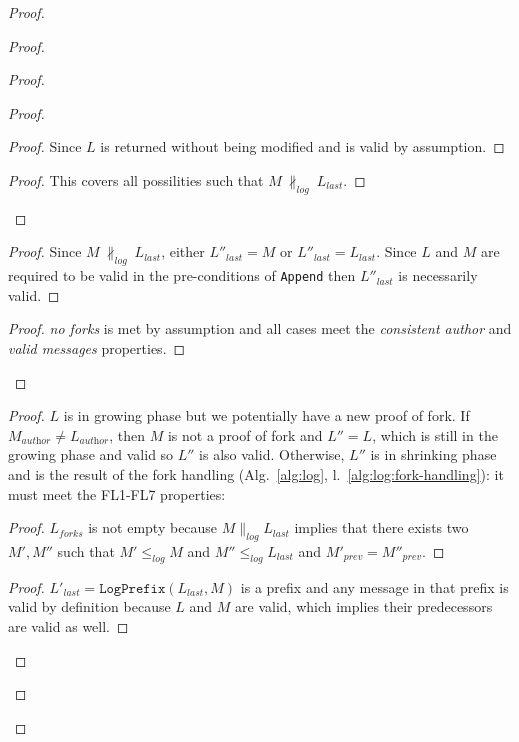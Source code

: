 \documentclass[9pt, oneside]{article}   	%
\begin{document}
\begin{proof}
\begin{proof}
\begin{proof}
\begin{proof}
					\begin{proof}
						Since $L$ is returned without being modified and is valid by assumption.
					\end{proof}
					
					\qedstep{}
					\begin{proof}
						This covers all possilities such that $M ~\nparallel_\textit{log}~ L_\textit{last}$.
					\end{proof}					
			\end{proof}
			
			\begin{proof}
				Since $M ~\nparallel_\textit{log}~ L_\textit{last}$, either $L''_\textit{last} = M$ or $L''_\textit{last} = L_\textit{last}$. Since $L$ and $M$ are required to be valid in the pre-conditions of \texttt{Append} then $L''_\textit{last}$ is necessarily valid.
			\end{proof}
			
			\qedstep{}
			\begin{proof}
				\textit{no forks} is met by assumption and all cases meet the \textit{consistent author} and \textit{valid messages} properties.
			\end{proof}
		\end{proof}
		
		\begin{proof}
			$L$ is in growing phase but we potentially have a new proof of fork. If $M_\textit{author} \neq L_\textit{author}$, then $M$ is not a proof of fork and $L'' = L$, which is still in the growing phase and valid so $L''$ is also valid. Otherwise,  $L''$ is in shrinking phase and is the result of the fork handling (Alg.~\ref{alg:log}, l.~\ref{alg:log:fork-handling}): it must meet the FL1-FL7 properties:
				\begin{proof}
					$L_\textit{forks}$ is not empty because $M \parallel_\textit{log} L_\textit{last}$ implies that there exists two $M',M''$ such that $M' \leq_\textit{log} M$ and $M'' \leq_\textit{log} L_\textit{last}$ and $M'_\textit{prev} = M''_\textit{prev}$.
				\end{proof}
				
				\begin{proof}
					$L'_\textit{last} = \texttt{LogPrefix}(L_\textit{last},M)$ is a prefix and any message in that prefix is valid by definition because $L$ and $M$ are valid, which implies their predecessors are valid as well.
				\end{proof}
				

\end{proof}
\end{proof}
\end{proof}
\end{document}
